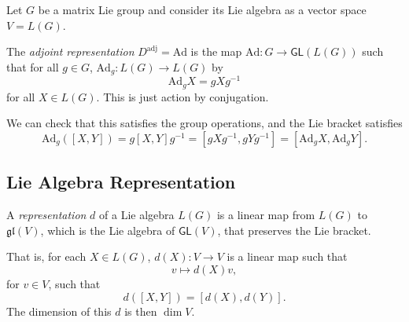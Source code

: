 \documentclass[12pt]{article}
\begin{document}
Let $G$ be a matrix Lie group and consider its Lie algebra as a vector space $V = L(G)$.

\begin{definition}
	The \emph{adjoint representation} $D^{\mathrm{adj}} = \mathrm{Ad}$ is the map $\mathrm{Ad} : G \to \mathsf{GL}(L(G))$ such that for all $g \in G$, $\mathrm{Ad}_g : L(G) \to L(G)$ by
	\[
	\mathrm{Ad}_g X = g X g^{-1}
	\]
	for all $X \in L(G)$. This is just action by conjugation.
\end{definition}

We can check that this satisfies the group operations, and the Lie bracket satisfies
\[
	\mathrm{Ad}_g([X, Y]) = g[X, Y]g^{-1} = [gXg^{-1}, gYg^{-1}] = [\mathrm{Ad}_g X, \mathrm{Ad}_g Y].
\]

\subsection{Lie Algebra Representation}%
\label{sub:lar}

\begin{definition}
	A \emph{representation} $d$ of a Lie algebra $L(G)$ is a linear map from $L(G)$ to $\mathfrak{gl}(V)$, which is the Lie algebra of $\mathsf{GL}(V)$, that preserves the Lie bracket.

	That is, for each $X \in L(G)$, $d(X) : V \to V$ is a linear map such that
	\[
	v \mapsto d(X) v,
	\]
	for $v \in V$, such that
	\[
		d([X, Y]) = [d(X), d(Y)].
	\]
	The dimension of this $d$ is then $\dim V$.
\end{definition}


\newpage

\printindex
\end{document}
